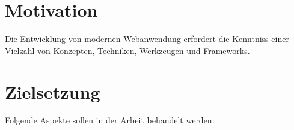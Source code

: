 
\section{Motivation}\label{sec:motivation}

Die Entwicklung von modernen Webanwendung erfordert die Kenntniss einer Vielzahl von Konzepten, Techniken, Werkzeugen und Frameworks.

\section{Zielsetzung}\label{sec:zielsetzung}

Folgende Aspekte sollen in der Arbeit behandelt werden:

